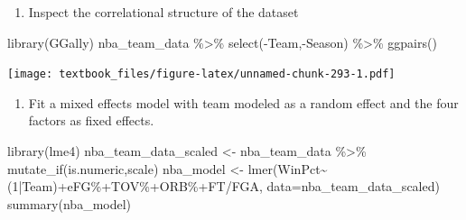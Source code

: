 \documentclass[
  11pt,
]{book}
\newenvironment{Shaded}{\begin{snugshade}}{\end{snugshade}}
\newcommand{\AttributeTok}[1]{\textcolor[rgb]{0.77,0.63,0.00}{#1}}
\newcommand{\DecValTok}[1]{\textcolor[rgb]{0.00,0.00,0.81}{#1}}
\newcommand{\FunctionTok}[1]{\textcolor[rgb]{0.00,0.00,0.00}{#1}}
\newcommand{\NormalTok}[1]{#1}
\newcommand{\OtherTok}[1]{\textcolor[rgb]{0.56,0.35,0.01}{#1}}
\newcommand{\SpecialCharTok}[1]{\textcolor[rgb]{0.00,0.00,0.00}{#1}}
\newcommand{\StringTok}[1]{\textcolor[rgb]{0.31,0.60,0.02}{#1}}
\providecommand{\tightlist}{%
  \setlength{\itemsep}{0pt}\setlength{\parskip}{0pt}}
\theoremstyle{definition}
\theoremstyle{definition}
\theoremstyle{definition}
\theoremstyle{definition}
\theoremstyle{remark}
\begin{document}
\newpage

\begin{enumerate}
\def\labelenumi{(\alph{enumi})}
\setcounter{enumi}{1}
\tightlist
\item
  Inspect the correlational structure of the dataset
\end{enumerate}

\begin{Shaded}
\begin{Highlighting}[]
\FunctionTok{library}\NormalTok{(GGally)}
\NormalTok{nba\_team\_data }\SpecialCharTok{\%\textgreater{}\%} \FunctionTok{select}\NormalTok{(}\SpecialCharTok{{-}}\NormalTok{Team,}\SpecialCharTok{{-}}\NormalTok{Season) }\SpecialCharTok{\%\textgreater{}\%} \FunctionTok{ggpairs}\NormalTok{()}
\end{Highlighting}
\end{Shaded}

\texttt{[image: textbook\_files/figure-latex/unnamed-chunk-293-1.pdf]}

\newpage

\begin{enumerate}
\def\labelenumi{(\alph{enumi})}
\setcounter{enumi}{2}
\tightlist
\item
  Fit a mixed effects model with team modeled as a random effect and the four factors as fixed effects.
\end{enumerate}

\begin{Shaded}
\begin{Highlighting}[]
\FunctionTok{library}\NormalTok{(lme4)}
\NormalTok{nba\_team\_data\_scaled }\OtherTok{\textless{}{-}}\NormalTok{ nba\_team\_data }\SpecialCharTok{\%\textgreater{}\%} \FunctionTok{mutate\_if}\NormalTok{(is.numeric,scale)}
\NormalTok{nba\_model }\OtherTok{\textless{}{-}} \FunctionTok{lmer}\NormalTok{(WinPct}\SpecialCharTok{\textasciitilde{}}\NormalTok{(}\DecValTok{1}\SpecialCharTok{|}\NormalTok{Team)}\SpecialCharTok{+}\StringTok{\textasciigrave{}}\AttributeTok{eFG\%}\StringTok{\textasciigrave{}}\SpecialCharTok{+}\StringTok{\textasciigrave{}}\AttributeTok{TOV\%}\StringTok{\textasciigrave{}}\SpecialCharTok{+}\StringTok{\textasciigrave{}}\AttributeTok{ORB\%}\StringTok{\textasciigrave{}}\SpecialCharTok{+}\StringTok{\textasciigrave{}}\AttributeTok{FT/FGA}\StringTok{\textasciigrave{}}\NormalTok{,}
                  \AttributeTok{data=}\NormalTok{nba\_team\_data\_scaled)}
\FunctionTok{summary}\NormalTok{(nba\_model)}
\end{Highlighting}
\end{Shaded}
\end{document}
